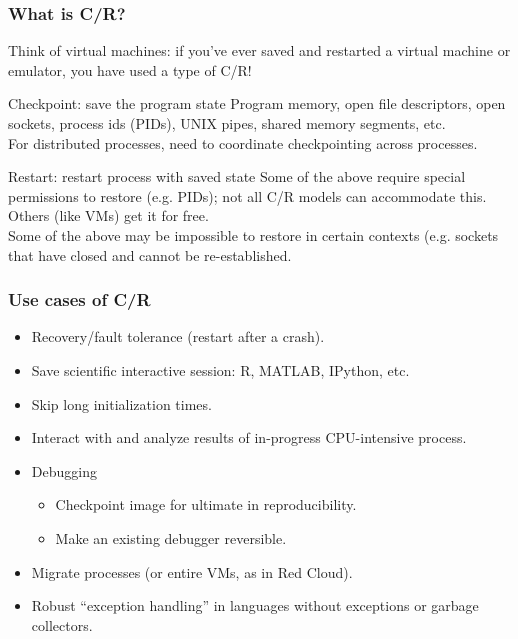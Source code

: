 \documentclass[compress]{beamer}
\begin{document}
\begin{frame}
\frametitle{What is C/R?}

Think of virtual machines: if you've ever saved and restarted a virtual machine
or emulator, you have used a type of C/R!

\begin{block}{Checkpoint: save the program state}
  Program memory, open file descriptors, open sockets, process ids (PIDs), UNIX pipes,
  shared memory segments, etc.\\
\vspace{1ex}
For distributed processes, need to coordinate checkpointing across processes.\\
\end{block}

\begin{block}{Restart: restart process with saved state}
  Some of the above require special permissions to restore (e.g. PIDs); not all
  C/R models can accommodate this. Others (like VMs) get it for free.\\
\vspace{1ex}
  Some of the above may be impossible to restore in certain contexts (e.g. sockets
  that have closed and cannot be re-established.\\
\end{block}


\end{frame}
  


\begin{frame}
\frametitle{Use cases of C/R}

\begin{itemize}
  \item{Recovery/fault tolerance (restart after a crash).}
  \item{Save scientific interactive session: R, MATLAB, IPython, etc.}
  \item{Skip long initialization times.}
  \item{Interact with and analyze results of in-progress CPU-intensive process.}
  \item{Debugging}
    \begin{itemize}
    \item{Checkpoint image for ultimate in reproducibility.}
    \item{Make an existing debugger reversible.}
    \end{itemize}
  \item{Migrate processes (or entire VMs, as in Red Cloud).}
  \item{Robust “exception handling” in languages without exceptions or garbage collectors.}
\end{itemize}
    
\end{frame}
\end{document}
